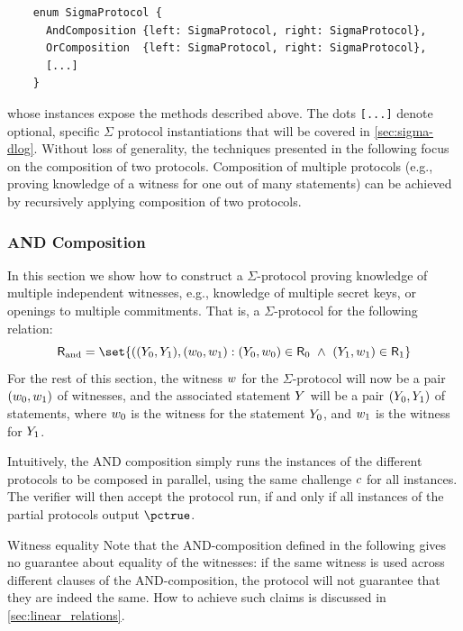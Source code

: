 \documentclass[11pt]{article}
\begin{document}
  \begin{verbatim}
    enum SigmaProtocol {
      AndComposition {left: SigmaProtocol, right: SigmaProtocol},
      OrComposition  {left: SigmaProtocol, right: SigmaProtocol},
      [...]
    }
  \end{verbatim}
whose instances expose the methods described above.
The dots \texttt{[...]} denote optional, specific $\Sigma$ protocol instantiations that will be covered in \cref{sec:sigma-dlog}.
  Without loss of generality, the techniques presented in the following focus on the composition of two protocols.
  Composition of multiple protocols (e.g., proving knowledge of a witness for one out of many statements) can be achieved by recursively applying composition of two protocols.

  \subsubsection{AND Composition}
  In this section we show how to construct a $\Sigma$-protocol proving knowledge of multiple independent witnesses, e.g., knowledge of multiple secret keys, or openings to multiple commitments.
  That is, a $\Sigma$-protocol for the following relation:
\[
  \andrelation = \set{
    ((\statement_0,\statement_1),(\witness_0,\witness_1) : (\statement_0,\witness_0)\in \relation_0 ~\land~ (\statement_1,\witness_1)\in\relation_1}
\]
For the rest of this section, the witness $w$ for the $\Sigma$-protocol will now be a pair $(w_0, w_1)$ of witnesses, and the associated statement $Y$ will be a pair $(Y_0, Y_1)$ of statements, where $w_0$ is the witness for the statement $Y_0$, and $w_1$ is the witness for $Y_1$.

  Intuitively, the AND composition simply runs the instances of the different protocols to be composed in parallel, using the same challenge $c$ for all instances.
  The verifier will then accept the protocol run, if and only if all instances of the partial protocols output $\accept$.
  \begin{remark}{Witness equality}{}
  Note that the AND-composition defined in the following gives no guarantee about equality of the witnesses: if the same witness is used across different clauses of the AND-composition, the protocol will not guarantee that they are indeed the same.
	How to achieve such claims is discussed in \cref{sec:linear_relations}.
  \end{remark}
\end{document}
